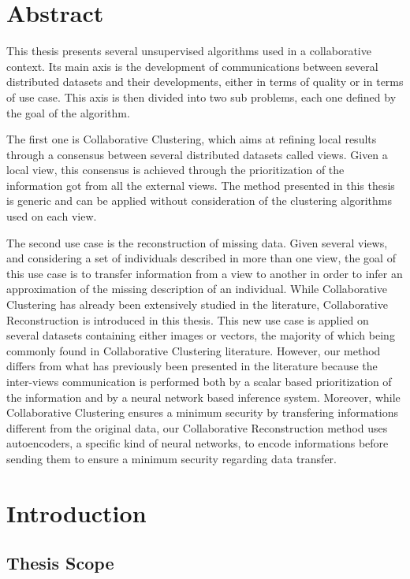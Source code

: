 \chapter{Abstract}

This thesis presents several unsupervised algorithms used in a collaborative context. Its main axis is the development of communications between several distributed datasets and their developments, either in terms of quality or in terms of use case. This axis is then divided into two sub problems, each one defined by the goal of the algorithm.

The first one is Collaborative Clustering, which aims at refining local results through a consensus between several distributed datasets called views. Given a local view, this consensus is achieved through the prioritization of the information got from all the external views. The method presented in this thesis is generic and can be applied without consideration of the clustering algorithms used on each view.

The second use case is the reconstruction of missing data. Given several views, and considering a set of individuals described in more than one view, the goal of this use case is to transfer information from a view to another in order to infer an approximation of the missing description of an individual. While Collaborative Clustering has already been extensively studied in the literature, Collaborative Reconstruction is introduced in this thesis. This new use case is applied on several datasets containing either images or vectors, the majority of which being commonly found in Collaborative Clustering literature. However, our method differs from what has previously been presented in the literature because the inter-views communication is performed both by a scalar based prioritization of the information and by a neural network based inference system. Moreover, while Collaborative Clustering ensures a minimum security by transfering informations different from the original data, our Collaborative Reconstruction method uses autoencoders, a specific kind of neural networks, to encode informations before sending them to ensure a minimum security regarding data transfer.

\chapter{Introduction}

\minitoc{}
\newpage

\section{Thesis Scope}

